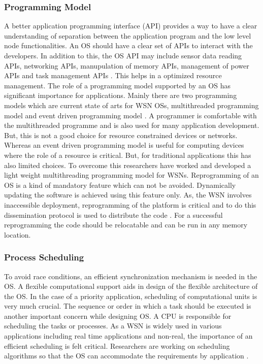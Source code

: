 \documentclass[12pt,journal,communications surveys and tutorials]{IEEEtran}
\begin{document}
\subsubsection{Programming Model}
A better application programming interface (API) provides a way to have a clear understanding of separation between the application program and the low level node functionalities. An OS should have a clear set of APIs to interact with the developers. In addition to this, the OS API may include sensor data reading APIs, networking APIs, manupulation of memory APIs, management of power APIs and task management APIs \cite{1563113}. This helps in a optimized resource management. The role of a programming model supported by an OS has significant importance for applications. Mainly there are two programming models which are current state of arts for WSN OSs, multithreaded programming model and event driven programming model \cite{farooq2011operating}. A programmer is comfortable with the multithreaded programme and is also used for many application development. But, this is not a good choice for resource constrained devices or networks. Whereas an event driven programming model is useful for computing devices where the role of a resource is critical. But, for traditional applications this has also limited choices. To overcome this researchers have worked and developed a light weight multithreading programming model for WSNs. Reprogramming of an OS is a kind of mandatory feature which can not be avoided. Dynamically updating the software is achieved using this feature only. As, the WSN involves inaccessible deployment, reprogramming of the platform is critical and to do this dissemination protocol is used to distribute the code \cite{hui2004dynamic,stathopoulos2003remote}. For a successful reprogramming the code should be relocatable and can be run in any memory location.
\subsubsection{Process Scheduling}
To avoid race conditions, an efficient synchronization mechanism is needed in the OS. A flexible computational support aids in design of the flexible architecture of the OS. In the case of a priority application, scheduling of computational units is very much crucial. The sequence or order in which a task should be executed is another important concern while designing OS. A CPU is responsible for scheduling the tasks or processes. As a WSN is widely used in various applications including real time applications and non-real, the importance of an efficient scheduling is felt critical. Researchers are working on scheduling algorithms so that the OS can accommodate the requirements by application \cite{levis2012experiences}.
\end{document}
